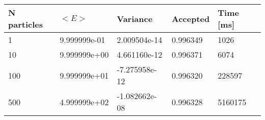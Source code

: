 \begin{table}[h!]
\begin{tabular}{|l|l|l|l|l|}
\hline 
N particles & $<E>$ & Variance & Accepted & Time [ms]\\ 
 \hline 
1 & 9.999999e-01 & 2.009504e-14 & 0.996349 & 1026 \\ \hline 
10 & 9.999999e+00 & 4.661160e-12 & 0.996371 & 6074 \\ \hline 
100 & 9.999999e+01 & -7.275958e-12 & 0.996320 & 228597 \\ \hline 
500 & 4.999999e+02 & -1.082662e-08 & 0.996328 & 5160175 \\ \hline 
\end{tabular}
\label{i:n2} 
\end{table}
